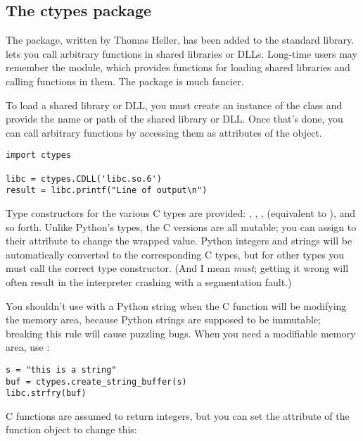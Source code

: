 \documentclass{howto}
\begin{document}
\subsection{The ctypes package\label{module-ctypes}}

The  package, written by Thomas Heller, has been added 
to the standard library.   lets you call arbitrary functions 
in shared libraries or DLLs.  Long-time users may remember the  module, which 
provides functions for loading shared libraries and calling functions in them.  The  package is much fancier.

To load a shared library or DLL, you must create an instance of the 
 class and provide the name or path of the shared library
or DLL.  Once that's done, you can call arbitrary functions
by accessing them as attributes of the  object.  

\begin{verbatim}
import ctypes

libc = ctypes.CDLL('libc.so.6')
result = libc.printf("Line of output\n")
\end{verbatim}

Type constructors for the various C types are provided: ,
, ,  (equivalent to ), and so forth.  Unlike Python's types, the C versions are all mutable; you can assign to their  attribute
to change the wrapped value.  Python integers and strings will be automatically
converted to the corresponding C types, but for other types you 
must call the correct type constructor.  (And I mean \emph{must}; 
getting it wrong will often result in the interpreter crashing 
with a segmentation fault.)

You shouldn't use  with a Python string when the C function will be modifying the memory area, because Python strings are 
supposed to be immutable; breaking this rule will cause puzzling bugs.  When you need a modifiable memory area,
use :

\begin{verbatim}
s = "this is a string"
buf = ctypes.create_string_buffer(s)
libc.strfry(buf)
\end{verbatim}

C functions are assumed to return integers, but you can set
the  attribute of the function object to 
change this:
\end{document}
